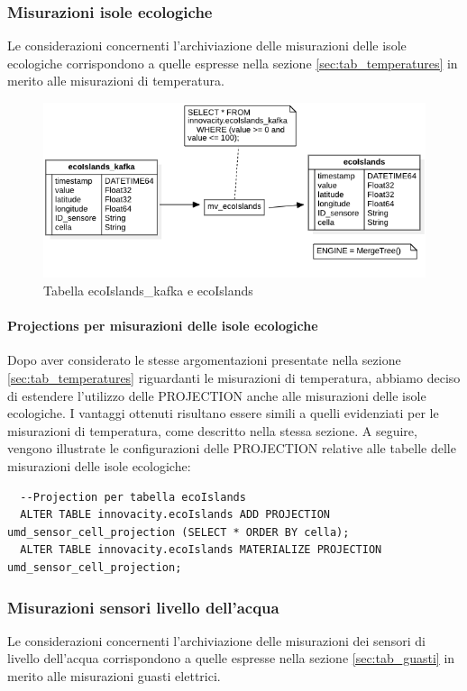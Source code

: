 \subsubsection{Misurazioni isole ecologiche}
Le considerazioni concernenti l'archiviazione delle misurazioni delle isole ecologiche corrispondono a quelle espresse nella sezione \ref{sec:tab_temperatures} in merito alle misurazioni di temperatura.

\begin{figure}[H]
  \centering
  \includegraphics[width=1\textwidth]{../Images/SpecificaTecnica/ecoIslands.png}
  \caption{Tabella ecoIslands\_kafka e ecoIslands}
  \label{fig:umidities}
\end{figure}

\paragraph{Projections per misurazioni delle isole ecologiche} 
Dopo aver considerato le stesse argomentazioni presentate nella sezione \ref{sec:tab_temperatures} riguardanti le misurazioni di temperatura, abbiamo deciso di estendere l'utilizzo delle PROJECTION anche alle misurazioni delle isole ecologiche. I vantaggi ottenuti risultano essere simili a quelli evidenziati per le misurazioni di temperatura, come descritto nella stessa sezione. A seguire, vengono illustrate le configurazioni delle PROJECTION relative alle tabelle delle misurazioni delle isole ecologiche:

\begin{lstlisting}
  --Projection per tabella ecoIslands
  ALTER TABLE innovacity.ecoIslands ADD PROJECTION umd_sensor_cell_projection (SELECT * ORDER BY cella);
  ALTER TABLE innovacity.ecoIslands MATERIALIZE PROJECTION umd_sensor_cell_projection;
\end{lstlisting}

\subsubsection{Misurazioni sensori livello dell’acqua}
Le considerazioni concernenti l'archiviazione delle misurazioni dei sensori di livello dell'acqua corrispondono a quelle espresse nella sezione \ref{sec:tab_guasti} in merito alle misurazioni guasti elettrici.

